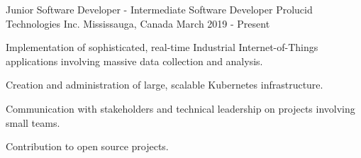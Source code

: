 

\begin{cventries}

  \cventry
    {Junior Software Developer - Intermediate Software Developer}
    {Prolucid Technologies Inc.}    
    {Mississauga, Canada}
    {March 2019 - Present}
    {
      \begin{cvitems}
        \item{Implementation of sophisticated, real-time Industrial Internet-of-Things applications involving massive data collection and analysis.}
        \item{Creation and administration of large, scalable Kubernetes infrastructure.}
        \item{Communication with stakeholders and technical leadership on projects involving small teams.}
        \item{Contribution to open source projects.}
      \end{cvitems}
    }
    

\end{cventries}


